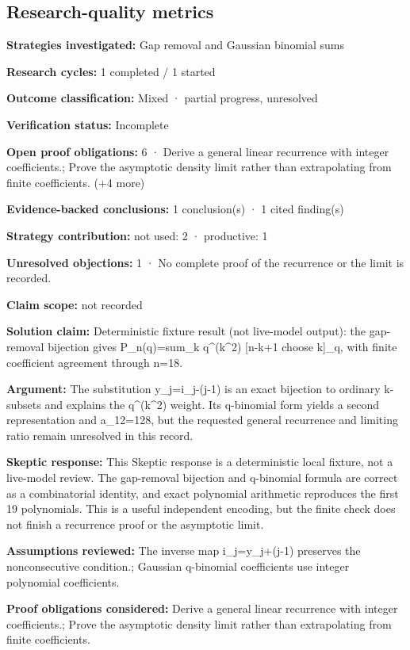 \documentclass[11pt]{article}
\begin{document}
\subsection{Research-quality metrics}
\textbf{Strategies investigated:} Gap removal and Gaussian binomial sums\par
\textbf{Research cycles:} 1 completed / 1 started\par
\textbf{Outcome classification:} Mixed · partial progress, unresolved\par
\textbf{Verification status:} Incomplete\par
\textbf{Open proof obligations:} 6 · Derive a general linear recurrence with integer coefficients.; Prove the asymptotic density limit rather than extrapolating from finite coefficients. (+4 more)\par
\textbf{Evidence-backed conclusions:} 1 conclusion(s) · 1 cited finding(s)\par
\textbf{Strategy contribution:} not used: 2 · productive: 1\par
\textbf{Unresolved objections:} 1 · No complete proof of the recurrence or the limit is recorded.\par
\textbf{Claim scope:} not recorded\par
\textbf{Solution claim:} Deterministic fixture result (not live-model output): the gap-removal bijection gives P\_n(q)=sum\_k q\textasciicircum{}(k\textasciicircum{}2) [n-k+1 choose k]\_q, with finite coefficient agreement through n=18.\par
\textbf{Argument:} The substitution y\_j=i\_j-(j-1) is an exact bijection to ordinary k-subsets and explains the q\textasciicircum{}(k\textasciicircum{}2) weight. Its q-binomial form yields a second representation and a\_12=128, but the requested general recurrence and limiting ratio remain unresolved in this record.\par
\textbf{Skeptic response:} This Skeptic response is a deterministic local fixture, not a live-model review. The gap-removal bijection and q-binomial formula are correct as a combinatorial identity, and exact polynomial arithmetic reproduces the first 19 polynomials. This is a useful independent encoding, but the finite check does not finish a recurrence proof or the asymptotic limit.\par
\textbf{Assumptions reviewed:} The inverse map i\_j=y\_j+(j-1) preserves the nonconsecutive condition.; Gaussian q-binomial coefficients use integer polynomial coefficients.\par
\textbf{Proof obligations considered:} Derive a general linear recurrence with integer coefficients.; Prove the asymptotic density limit rather than extrapolating from finite coefficients.\par
\end{document}
